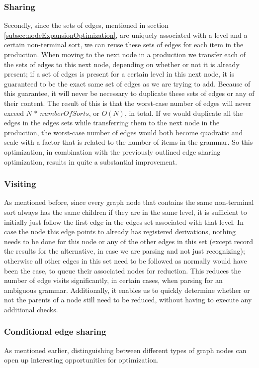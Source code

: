 \documentclass[a4paper,10pt]{article}
\begin{document}
\subsubsection{Sharing}
Secondly, since the sets of edges, mentioned in section \ref{subsec:nodeExpansionOptimization}, are uniquely associated with a level and a certain non-terminal sort, we can reuse these sets of edges for each item in the production. When moving to the next node in a production we transfer each of the sets of edges to this next node, depending on whether or not it is already present; if a set of edges is present for a certain level in this next node, it is guaranteed to be the exact same set of edges as we are trying to add. Because of this guarantee, it will never be necessary to duplicate these sets of edges or any of their content. The result of this is that the worst-case number of edges will never exceed $N\,*\,\mathit{numberOfSorts}$, or $O(N)$, in total. If we would duplicate all the edges in the edges sets while transferring them to the next node in the production, the worst-case number of edges would both become quadratic and scale with a factor that is related to the number of items in the grammar. So this optimization, in combination with the previously outlined edge sharing optimization, results in quite a substantial improvement.

\subsubsection{Visiting}
\label{subsec:edgeVisitOptimization}
As mentioned before, since every graph node that contains the same non-terminal sort always has the same children if they are in the same level, it is sufficient to initially just follow the first edge in the edges set associated with that level. In case the node this edge points to already has registered derivations, nothing needs to be done for this node or any of the other edges in this set (except record the results for the alternative, in case we are parsing and not just recognizing); otherwise all other edges in this set need to be followed as normally would have been the case, to queue their associated nodes for reduction. This reduces the number of edge visits significantly, in certain cases, when parsing for an ambiguous grammar. Additionally, it enables us to quickly determine whether or not the parents of a node still need to be reduced, without having to execute any additional checks.

\subsubsection{Conditional edge sharing}
As mentioned earlier, distinguishing between different types of graph nodes can open up interesting opportunities for optimization.
\end{document}
